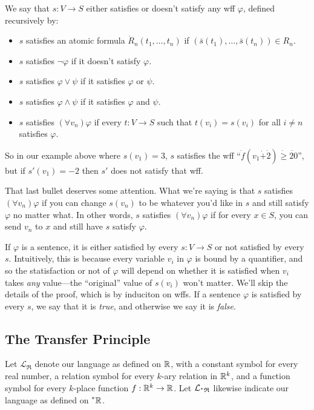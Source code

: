 We say that $s: V \to S$ either satisfies or doesn't satisfy any wff $\varphi$, defined recursively by:
\begin{itemize}
    \item $s$ satisfies an atomic formula $\dot R_n(t_1, \ldots, t_n)$ if $(\bar s(t_1), \ldots, \bar s(t_n)) \in R_n$.
    \item $s$ satisfies $\neg \varphi$ if it doesn't satisfy $\varphi$.
    \item $s$ satisfies $\varphi \lor \psi$ if it satisfies $\varphi$ or $\psi$.
    \item $s$ satisfies $\varphi \land \psi$ if it satisfies $\varphi$ and $\psi$.
    \item $s$ satisfies $(\forall v_n) \varphi$ if every $t: V \to S$ such that $t(v_i) = s(v_i)$ for all $i \neq n$ satisfies $\varphi$.
\end{itemize}
So in our example above where $s(v_1) = 3$, $s$ satisfies the wff ``$\dot f(v_1 \dot + \dot 2) \dot \geq \dot{20}$'', but if $s'(v_1) = -2$ then $s'$ does not satisfy that wff.

That last bullet deserves some attention. What we're saying is that $s$ satisfies $(\forall v_n) \varphi$ if you can change $s(v_n)$ to be whatever you'd like in $s$ and still satisfy $\varphi$ no matter what. In other words, $s$ satisfies $(\forall v_n) \varphi$ if for every $x \in S$, you can send $v_n$ to $x$ and still have $s$ satisfy $\varphi$.

If $\varphi$ is a sentence, it is either satisfied by every $s: V \to S$ or not satisfied by every $s$. Intuitively, this is because every variable $v_i$ in $\varphi$ is bound by a quantifier, and so the statisfaction or not of $\varphi$ will depend on whether it is satisfied when $v_i$ takes \textit{any} value---the ``original'' value of $s(v_i)$ won't matter. We'll skip the details of the proof, which is by induciton on wffs. If a sentence $\varphi$ is satisfied by every $s$, we say that it is \textit{true}, and otherwise we say it is \textit{false}.

\subsection{The Transfer Principle}
Let $\mathcal{L}_\mathfrak{R}$ denote our language as defined on $\mathbb{R}$, with a constant symbol for every real number, a relation symbol for every $k$-ary relation in $\mathbb{R}^k$, and a function symbol for every $k$-place function $f: \mathbb{R}^k \to \mathbb{R}$. Let $\mathcal{L}_{\prescript{*}{}{\mathfrak{R}}}$ likewise indicate our language as defined on $\prescript{*}{}{\mathbb{R}}$.

